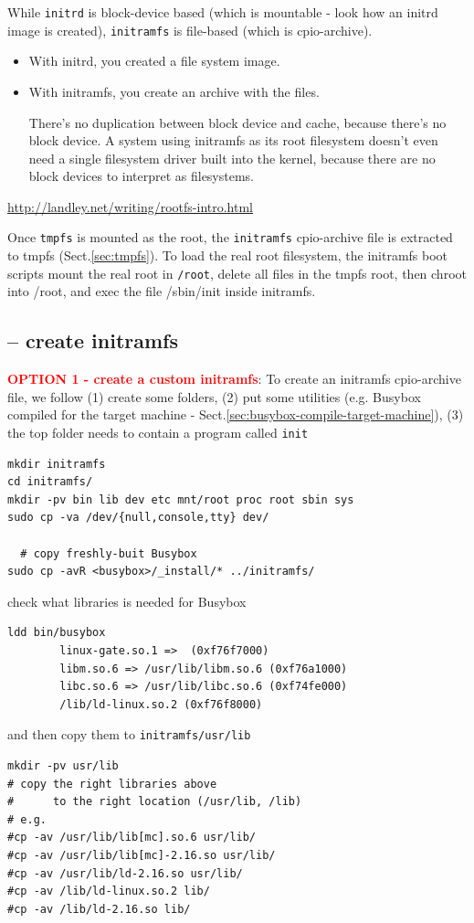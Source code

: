 While \verb!initrd! is block-device based (which is mountable - look how an
initrd image is created), \verb!initramfs! is file-based (which is
cpio-archive).

\begin{itemize}
  \item With initrd, you created a file system image. 
  
  \item With initramfs, you create an archive with the files.

There's no duplication between block device and cache, because there's no block
device. A system using initramfs as its root filesystem doesn't even need a
single filesystem driver built into the kernel, because there are no block
devices to interpret as filesystems.
\end{itemize}
\url{http://landley.net/writing/rootfs-intro.html}

Once \verb!tmpfs! is mounted as the root, the \verb!initramfs! cpio-archive file
is extracted to tmpfs (Sect.\ref{sec:tmpfs}).
To load the real root filesystem, the initramfs boot scripts mount the real root
in \verb!/root!, delete all files in the tmpfs root, then chroot into /root, and
exec the file /sbin/init inside initramfs.

\subsection{-- create initramfs}
\label{sec:initramfs-create-option-1}
  
\textcolor{red}{\bf OPTION 1 - create a custom initramfs}: To create an
initramfs cpio-archive file, we follow (1) create some folders, (2) put
some utilities (e.g. Busybox compiled for the target machine -
Sect.\ref{sec:busybox-compile-target-machine}), (3) the top folder needs to
contain a program called \verb!init!

\begin{verbatim}
mkdir initramfs
cd initramfs/
mkdir -pv bin lib dev etc mnt/root proc root sbin sys
sudo cp -va /dev/{null,console,tty} dev/

  # copy freshly-buit Busybox
sudo cp -avR <busybox>/_install/* ../initramfs/
\end{verbatim}
check what libraries is needed for Busybox 
\begin{verbatim}
ldd bin/busybox
        linux-gate.so.1 =>  (0xf76f7000)
        libm.so.6 => /usr/lib/libm.so.6 (0xf76a1000)
        libc.so.6 => /usr/lib/libc.so.6 (0xf74fe000)
        /lib/ld-linux.so.2 (0xf76f8000)
\end{verbatim}
and then copy them to
\verb!initramfs/usr/lib!
\begin{verbatim}
mkdir -pv usr/lib
# copy the right libraries above 
#      to the right location (/usr/lib, /lib)
# e.g.
#cp -av /usr/lib/lib[mc].so.6 usr/lib/
#cp -av /usr/lib/lib[mc]-2.16.so usr/lib/
#cp -av /usr/lib/ld-2.16.so usr/lib/
#cp -av /lib/ld-linux.so.2 lib/
#cp -av /lib/ld-2.16.so lib/
\end{verbatim}

